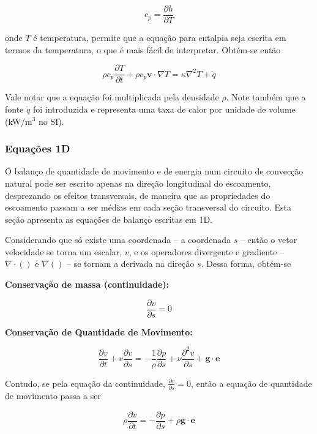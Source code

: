 \documentclass[a4paper,portuguese,10pt]{article}
\renewcommand{\D}{\partial}
\renewcommand{\vec}{\mathbf}
\begin{document}
\begin{equation}
  c_p = \frac{\D h}{\D T}
\end{equation}

onde $T$ é temperatura, permite que a equação para entalpia seja escrita em termos da temperatura, o que é mais fácil de interpretar. Obtém-se então

\begin{equation}
  \rho c_p\frac{\D T}{\D t}+\rho c_p\vec{v}\cdot\nabla T = \kappa\nabla^2T + \dot{q}
\end{equation}

Vale notar que a equação foi multiplicada pela densidade $\rho$. Note também que a fonte $\dot{q}$ foi introduzida e representa uma taxa de calor por unidade de volume (kW/m$^3$ no SI).

\subsubsection{Equações 1D}

O balanço de quantidade de movimento e de energia num circuito de convecção natural pode ser escrito apenas na direção longitudinal do escoamento, desprezando os efeitos transversais, de maneira que as propriedades do escoamento passam a ser médias em cada seção transversal do circuito. Esta seção apresenta as equações de balanço escritas em 1D.

Considerando que só existe uma coordenada -- a coordenada $s$ -- então o vetor velocidade se torna um escalar, $v$, e os operadores divergente e gradiente -- $\nabla\cdot()$ e $\nabla()$ -- se tornam a derivada na direção $s$. Dessa forma, obtém-se

\textbf{Conservação de massa (continuidade):}

\begin{equation}
  \frac{\D v}{\D s} = 0
\end{equation}

\textbf{Conservação de Quantidade de Movimento:}

\begin{equation}
  \frac{\D v}{\D t}+v\frac{\D v}{\D s} = -\frac{1}{\rho}\frac{\D p}{\D s} + \nu\frac{\D^2v}{\D s} + \vec{g}\cdot\vec{e}
\label{eqm_1d_completa}
\end{equation}

Contudo, se pela equação da continuidade, $\frac{\D v}{\D s} = 0$, então a equação de quantidade de movimento passa a ser

\begin{equation}
  \rho\frac{\D v}{\D t} = -\frac{\D p}{\D s} + \rho\vec{g}\cdot\vec{e}
\end{equation}
\end{document}
